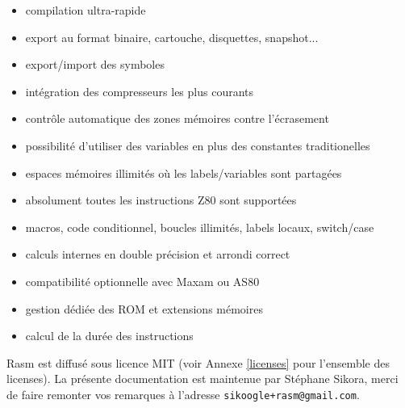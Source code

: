 \begin{xfr}
\begin{itemize}[noitemsep]
\item compilation ultra-rapide
\item export au format binaire, cartouche, disquettes, snapshot...
\item export/import des symboles
\item intégration des compresseurs les plus courants
\item contrôle automatique des zones mémoires contre l'écrasement
\item possibilité d'utiliser des variables en plus des constantes traditionelles
\item espaces mémoires illimités où les labels/variables sont partagées
\item absolument toutes les instructions Z80 sont supportées
\item macros, code conditionnel, boucles illimités, labels locaux, switch/case
\item calculs internes en double précision et arrondi correct
\item compatibilité optionnelle avec Maxam ou AS80
\item gestion dédiée des ROM et extensions mémoires
\item calcul de la durée des instructions
\end{itemize}
\medbreak
Rasm est diffusé sous licence MIT (voir Annexe \ref{licenses} pour l'ensemble des licenses).
\medbreak
La présente documentation est maintenue par Stéphane Sikora, merci de faire remonter vos remarques à l'adresse \texttt{sikoogle+rasm@gmail.com}.
\end{xfr}


